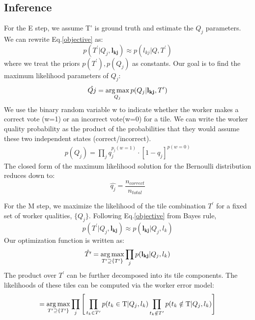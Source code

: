 {\subsection{Inference}
\par For the E step, we assume T' is ground truth and estimate the $Q_j$ parameters. We can rewrite Eq.\ref{objective} as: 
\begin{equation}
p(T^\prime| Q_j,\mathbf{l_{kj}})
\approx p(l_{kj}| Q,T^\prime)
\end{equation}
where we treat the priors $p(T^\prime),p(Q_j)$ as constants.
Our goal is to find the maximum likelihood parameters of $Q_j$: 
\begin{equation}
\hat{Qj} = \operatorname*{arg\,max}_{Q_j} p(Q_j| \mathbf{l_{kj}},T^\prime)
\end{equation}
We use the binary random variable w to indicate whether the worker makes a correct vote (w=1) or an incorrect vote(w=0) for a tile. We can write the worker quality probability as the product of the probabilities that they would assume these two independent states (correct/incorrect). 
\begin{align}
p(Q_j) = \prod_j q_j^{p_j(w=1)}\cdot [1-q_j]^{p(w=0)}
\end{align}
The closed form of the maximum likelihood solution for the Bernoulli distribution reduces down to: 
\begin{equation}
\hat{q_j}=\frac{n_{correct}}{n_{total}}
\end{equation}
\par For the M step, we maximize the likelihood of the tile combination $T^\prime$ for a fixed set of worker qualities, $\{Q_j\}$. Following Eq.\ref{objective} from Bayes rule, 
\begin{equation}
p(T^\prime| Q_j,\mathbf{l_{kj}})
\approx p(\mathbf{l_{kj}}|Q_j,l_k)
\end{equation}
Our optimization function is written as:
\begin{equation}
\hat{T^\prime}=\operatorname*{arg\,max}_{T^\prime\supseteq \{T^\prime\} } \prod_j p(\mathbf{l_{kj}}|Q_j,l_k)
\end{equation}
 The product over $T^\prime$ can be further decomposed into its tile components. The likelihoods of these tiles can be computed via the worker error model: 
\begin{equation}
=\operatorname*{arg\,max}_{T^\prime\supseteq \{T^\prime\}} \prod_j\Bigg[\prod_{t_k\in T^\prime} p(t_k\in \mathrm{T}|Q_j,l_k)\prod_{t_k\notin T^\prime} p(t_k\notin \mathrm{T}|Q_j,l_k)\Bigg]
\end{equation}
% 
% 
}
